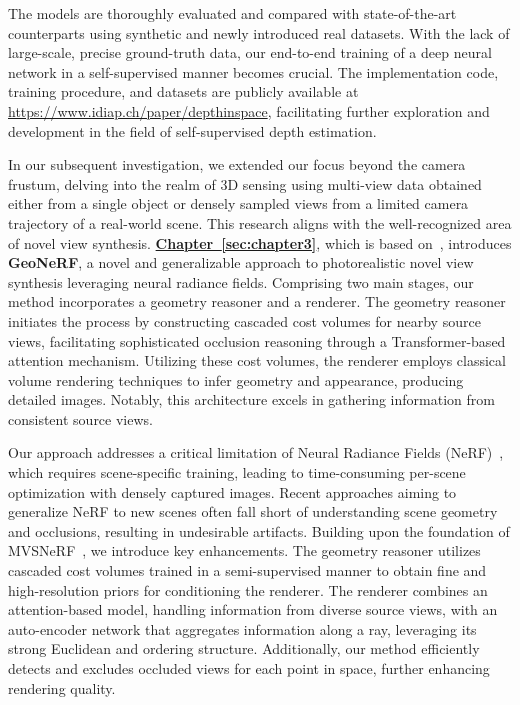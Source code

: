 The models are thoroughly evaluated and compared with state-of-the-art counterparts using synthetic and newly introduced real datasets. With the lack of large-scale, precise ground-truth data, our end-to-end training of a deep neural network in a self-supervised manner becomes crucial. The implementation code, training procedure, and datasets are publicly available at \href{https://www.idiap.ch/paper/depthinspace}{https://www.idiap.ch/paper/depthinspace}, facilitating further exploration and development in the field of self-supervised depth estimation.

In our subsequent investigation, we extended our focus beyond the camera frustum, delving into the realm of 3D sensing using multi-view data obtained either from a single object or densely sampled views from a limited camera trajectory of a real-world scene. This research aligns with the well-recognized area of novel view synthesis. \textbf{\hyperref[sec:chapter3]{Chapter~\ref{sec:chapter3}}}, which is based on~\cite{johari2022geonerf}, introduces \textbf{GeoNeRF}, a novel and generalizable approach to photorealistic novel view synthesis leveraging neural radiance fields. Comprising two main stages, our method incorporates a geometry reasoner and a renderer. The geometry reasoner initiates the process by constructing cascaded cost volumes for nearby source views, facilitating sophisticated occlusion reasoning through a Transformer-based attention mechanism. Utilizing these cost volumes, the renderer employs classical volume rendering techniques to infer geometry and appearance, producing detailed images. Notably, this architecture excels in gathering information from consistent source views.

Our approach addresses a critical limitation of Neural Radiance Fields (NeRF)~\citep{mildenhall2020nerf}, which requires scene-specific training, leading to time-consuming per-scene optimization with densely captured images. Recent approaches aiming to generalize NeRF to new scenes often fall short of understanding scene geometry and occlusions, resulting in undesirable artifacts. Building upon the foundation of MVSNeRF~\citep{chen2021mvsnerf}, we introduce key enhancements. The geometry reasoner utilizes cascaded cost volumes trained in a semi-supervised manner to obtain fine and high-resolution priors for conditioning the renderer. The renderer combines an attention-based model, handling information from diverse source views, with an auto-encoder network that aggregates information along a ray, leveraging its strong Euclidean and ordering structure. Additionally, our method efficiently detects and excludes occluded views for each point in space, further enhancing rendering quality.


